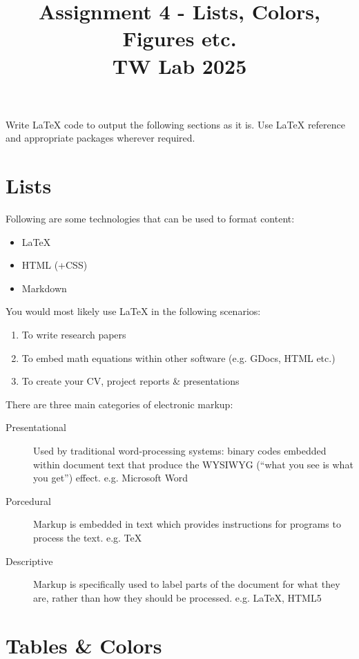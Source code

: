 \documentclass{article}
\title{\textbf{Assignment 4 - Lists, Colors, Figures etc.}\\\large TW Lab 2025}
\author{}
\date{}
\begin{document}
\maketitle
\vspace{-2em}

\noindent Write \LaTeX{} code to output the following sections as it is. Use \LaTeX{} reference and appropriate packages wherever required.

\section{Lists}

Following are some technologies that can be used to format content:
\begin{itemize}
    \item \LaTeX
    \item HTML (+CSS)
    \item Markdown
\end{itemize}

You would most likely use \LaTeX{} in the following scenarios:
\begin{enumerate}
    \item To write research papers
    \item To embed math equations within other software (e.g. GDocs, HTML etc.)
    \item To create your CV, project reports \& presentations
\end{enumerate}

There are three main categories of electronic markup:
\begin{description}
    \item[Presentational] Used by traditional word-processing systems: binary codes embedded within document text that produce the WYSIWYG (``what you see is what you get'') effect. e.g. Microsoft Word
    \item[Porcedural] Markup is embedded in text which provides instructions for programs to process the text. e.g. \TeX
    \item[Descriptive] Markup is specifically used to label parts of the document for what they are, rather than how they should be processed. e.g. \LaTeX, HTML5
\end{description}

\newpage

\section{Tables \& Colors}
\end{document}
